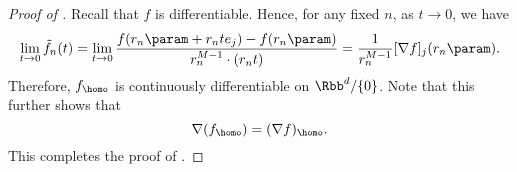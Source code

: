 \begin{proof}[Proof of ]
Recall that $f$ is differentiable. Hence, for any fixed $n$, as $t \to 0$, we have 
\[
    \lim_{t \to 0} \tilde f_n(t) = \lim_{t \to 0} \frac{f(r_n\param + r_n t e_j) - f(r_n\param)}{r_n^{M-1} \cdot ( r_n t )} = \frac{1}{r_n^{M-1}} [\nabla f]_j (r_n \param). 
\]
Therefore, $f_{\homo}$ is continuously differentiable on $\Rbb^d / \{0\}$.
 Note that this further shows that 
\[
    \nabla (f_\homo) = (\nabla f)_\homo. 
\]
This completes the proof of .
\end{proof}




